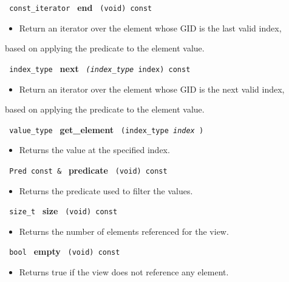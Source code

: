 \noindent
\texttt{%
const\_iterator
}
\newline
\textbf{end}%
\texttt{%
(void) const
}

\begin{itemize}
\item
Return an iterator over the element whose GID is the last valid index,
\end{itemize}
based on applying the predicate to the element value.

\noindent
\texttt{%
index\_type
}
\newline
\textbf{next}%
\texttt{%
\textit{(index\_type}%
index) const
}

\begin{itemize}
\item
Return an iterator over the element whose GID is the next valid index,
\end{itemize}
based on applying the predicate to the element value.

\noindent
\texttt{%
value\_type
}
\newline
\textbf{get\_element}%
\texttt{%
(index\_type
\textit{index}%
)
}

\begin{itemize}
\item
Returns the value at the specified index.
\end{itemize}

\noindent
\texttt{%
Pred const \&
}
\newline
\textbf{predicate}%
\texttt{%
(void) const
}

\begin{itemize}
\item
Returns the predicate used to filter the values.
\end{itemize}

\noindent
\texttt{%
size\_t
}
\newline
\textbf{size}%
\texttt{%
(void) const
}

\begin{itemize}
\item
Returns the number of elements referenced for the view.
\end{itemize}

\noindent
\texttt{%
bool
}
\newline
\textbf{empty}%
\texttt{%
(void) const
}

\begin{itemize}
\item
Returns true if the view does not reference any element.
\end{itemize}

